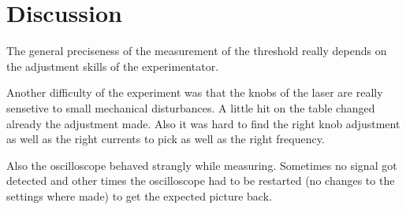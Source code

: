 \section{Discussion}
\label{sec:Diskussion}
\noindent
The general preciseness of the measurement of the threshold really depends on the adjustment skills of the 
experimentator. 

\noindent
Another difficulty of the experiment was that the knobs of the laser are really sensetive to small
mechanical disturbances. A little hit on the table changed already the adjustment made. 
Also it was hard to find the right knob adjustment as well as the right currents to pick as well as the right
frequency.

\noindent
Also the oscilloscope behaved strangly while measuring. Sometimes no signal got detected and other times 
the oscilloscope had to be restarted (no changes to the settings where made) to get the expected picture back.

